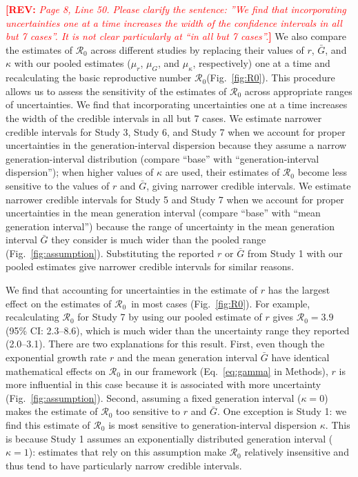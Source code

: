 \documentclass[12pt]{article}
\newcommand{\eref}[1]{Eq.~\ref{eq:#1}}
\newcommand{\fref}[1]{Fig.~\ref{fig:#1}}
\newcommand{\Ro}{\ensuremath{{\mathcal R}_{0}}\xspace}
\newcommand{\comment}[3]{\textcolor{#1}{\textbf{[#2: }\textsl{#3}\textbf{]}}}
\newcommand{\rev}[1]{\comment{red}{REV}{#1}}
\begin{document}
\rev{Page 8, Line 50. Please clarify the sentence: ”We find that incorporating uncertainties one at a
time increases the width of the confidence intervals in all but 7 cases”. It is not clear particularly
at “in all but 7 cases”.}
We also compare the estimates of \Ro across different studies by 
replacing their values of $r$, $\bar G$, and $\kappa$ with our pooled estimates ($\mu_r$, $\mu_G$, and $\mu_\kappa$, respectively) one at a time and recalculating the basic reproductive number \Ro (\fref{R0}).
This procedure allows us to assess the sensitivity of the estimates of \Ro across appropriate ranges of uncertainties.
We find that incorporating uncertainties one at a time increases the width of the credible intervals in all but 7 cases.
We estimate narrower credible intervals for Study 3, Study 6, and Study 7 when we account for proper uncertainties in the generation-interval dispersion because they assume a narrow generation-interval distribution (compare ``base'' with ``generation-interval dispersion'');
when higher values of $\kappa$ are used, their estimates of \Ro become less sensitive to the values of $r$ and $\bar G$, giving narrower credible intervals.
We estimate narrower credible intervals for Study 5 and Study 7 when we account for proper uncertainties in the mean generation interval (compare ``base'' with ``mean generation interval'') because the range of uncertainty in the mean generation interval $\bar G$ they consider is much wider than the pooled range (\fref{assumption}).
Substituting the reported $r$ or $\bar G$ from Study 1 with our pooled estimates give narrower credible intervals for similar reasons.

We find that accounting for uncertainties in the estimate of $r$ has the largest effect on the estimates of \Ro\ in most cases (\fref{R0}).
For example, recalculating \Ro for Study 7 by using our pooled estimate of $r$ gives $\Ro = 3.9$ (95\% CI: 2.3--8.6), which is much wider than the uncertainty range they reported (2.0--3.1).
There are two explanations for this result.
First, even though the exponential growth rate $r$ and the mean generation interval $\bar G$ have identical mathematical effects on \Ro in our framework (\eref{gamma} in Methods),
$r$ is more influential in this case because it is associated with more uncertainty (\fref{assumption}).
Second, assuming a fixed generation interval ($\kappa=0$) makes the estimate of \Ro too sensitive to $r$ and $\bar G$.
One exception is Study 1: we find this estimate of \Ro is most sensitive to generation-interval dispersion $\kappa$.
This is because Study 1 assumes an exponentially distributed generation interval ($\kappa=1$): estimates that rely on this assumption make \Ro relatively insensitive and thus tend to have particularly narrow credible intervals.
\end{document}
